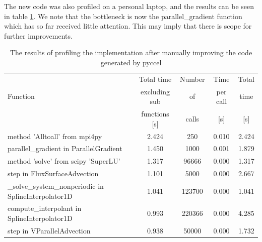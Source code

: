 The new code was also profiled on a personal laptop, and the results can be seen in table \ref{tab::yaman profile}. We note that the bottleneck is now the parallel\_gradient function which has so far received little attention. This may imply that there is scope for further improvements.

\begin{table}[ht]
\centering
 \begin{tabular}{|m{}|c|c|c|c|}
  \hline
          & Total time & Number & Time & Total \\
  Function & excluding sub & of & per call & time \\
          & functions [s] & calls & [s] & [s] \\
  \hline
  \hline
  method 'Alltoall' from mpi4py & 2.424 & 250 & 0.010 & 2.424 \\
  \hline
  parallel\_gradient in ParallelGradient & 1.450 & 1000 & 0.001 & 1.879 \\
  \hline
  method 'solve' from scipy 'SuperLU' & 1.317 & 96666 & 0.000 & 1.317 \\
  \hline
  step in FluxSurfaceAdvection & 1.101 & 5000 & 0.000 & 2.667 \\
  \hline
  \_solve\_system\_nonperiodic in SplineInterpolator1D & 1.041 & 123700 & 0.000 & 1.041 \\
  \hline
  compute\_interpolant in SplineInterpolator1D & 0.993 & 220366 & 0.000 & 4.285\\
  \hline
  step in VParallelAdvection & 0.938 & 50000 & 0.000 & 1.732\\
  \hline
 \end{tabular}
 \caption{\label{tab::yaman profile} The results of profiling the implementation after manually improving the code generated by pyccel}
\end{table}